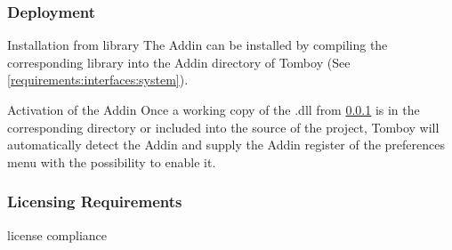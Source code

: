     \label{requirements:maintainability:codedoc}
    \begin{requirement}
    \end{requirement}

    \subsubsection{Deployment}
    \label{requirements:deployment}
    \begin{requirement}{Installation from library}
      \label{requirements:deployment:installation}
      The Addin can be installed by compiling the corresponding library into the Addin directory of Tomboy (See \ref{requirements:interfaces:system}).
    \end{requirement}

    \begin{requirement}{Activation of the Addin}
      \label{requirements:deployment:activation}
      Once a working copy of the .dll from \ref{requirements:deployment} is in the corresponding directory or included into the source of the project, Tomboy will automatically detect the Addin and supply the Addin register of the preferences menu with the possibility to enable it.
    \end{requirement}

    \subsubsection{Licensing Requirements}
    \label{requirements:license}
    \begin{requirement}{license compliance}
      \label{requirements:license:compliance}
    \end{requirement}


